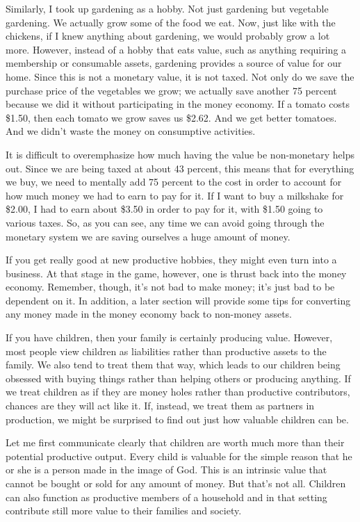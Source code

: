 Similarly, I took up gardening as a hobby. Not just gardening but
vegetable gardening. We actually grow some of the food we eat. Now,
just like with the chickens, if I knew anything about gardening, we
would probably grow a lot more. However, instead of a hobby that eats
value, such as anything requiring a membership or consumable assets,
gardening provides a source of value for our home. Since this is not a
monetary value, it is not taxed. Not only do we save the purchase price
of the vegetables we grow; we actually save another 75 percent because
we did it without participating in the money economy. If a tomato costs
\$1.50, then each tomato we grow saves us \$2.62. And we get better
tomatoes. And we didn’t waste the money on consumptive activities.

It is difficult to overemphasize how much having the value be non-monetary helps
out.  Since we are being taxed at about 43 percent, this means that for everything we buy,
we need to mentally add 75 percent to the cost in order to account for how much money
we had to earn to pay for it.  If I want to buy a milkshake for \$2.00, I had to 
earn about \$3.50 in order to pay for it, with \$1.50 going to various taxes.  So,
as you can see, any time we can avoid going through the monetary system we are
saving ourselves a huge amount of money.

If you get really good at new productive hobbies, they might even turn
into a business. At that stage in the game, however, one is thrust back
into the money economy.  Remember, though, it's not
bad to make money; it's just bad to be dependent on
it.  In addition, a later section will provide some tips for converting
any money made in the money economy back to non-money assets. 

If you have children, then your family is certainly producing value.
However, most people view children as liabilities rather than
productive assets to the family. We also tend to treat them that way,
which leads to our children being obsessed with buying things rather
than helping others or producing anything. If we treat
children as if they
are money holes rather than productive contributors, chances are they
will act like it. If, instead, we treat them as partners in production,
we might be surprised to find out just how valuable children can be. 

Let me first communicate clearly that children are worth
much more than their
potential productive output. Every child is valuable for the simple
reason that he or she is a person made in the image of God.  This is an
intrinsic value that cannot be bought or sold for any amount of money.
 But that's not all.  Children can also function as
productive members of a household and in that setting contribute still more value to
their families and society.

